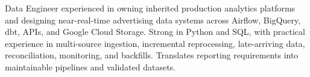 Data Engineer experienced in owning inherited production analytics platforms
and designing near-real-time advertising data systems across Airflow, BigQuery,
dbt, APIs, and Google Cloud Storage. Strong in Python and SQL, with practical
experience in multi-source ingestion, incremental reprocessing, late-arriving
data, reconciliation, monitoring, and backfills. Translates reporting
requirements into maintainable pipelines and validated datasets.
